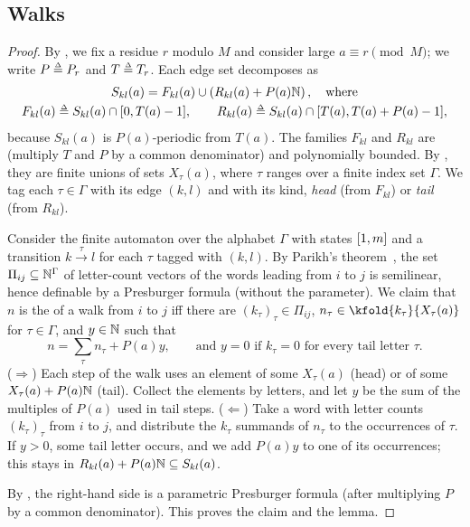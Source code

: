 \subsection{Walks}
\lemmaClosure*
\begin{proof}
    By , we fix a residue $r$ modulo $M$ and consider large $a \equiv r \pmod M$; we write $P \defeq P_r$ and $T \defeq T_r$.
    Each edge set decomposes as
    \begin{gather*}
        S_{kl}(a) = F_{kl}(a) \cup \left(R_{kl}(a) + P(a)\nat\right), \quad \text{where}\\
        F_{kl}(a) \defeq S_{kl}(a) \cap \range{0, T(a) - 1}, \qquad R_{kl}(a) \defeq S_{kl}(a) \cap \range{T(a), T(a) + P(a) - 1},
    \end{gather*}
    because $S_{kl}(a)$ is $P(a)$-periodic from $T(a)$.
    The families $F_{kl}$ and $R_{kl}$ are  (multiply $T$ and $P$ by a common denominator) and polynomially bounded.
    By , they are finite unions of sets $X_\tau(a)$, where $\tau$ ranges over a finite index set $\Gamma$.
    We tag each $\tau \in \Gamma$ with its edge $(k, l)$ and with its kind, \emph{head} (from $F_{kl}$) or \emph{tail} (from $R_{kl}$).

    Consider the finite automaton over the alphabet $\Gamma$ with states $[1, m]$ and a transition $k \xrightarrow{\tau} l$ for each $\tau$ tagged with $(k, l)$.
    By Parikh's theorem~\cite{parikhContextFreeLanguages1966}, the set $\Pi_{ij} \subseteq \mathbb{N}^{\Gamma}$ of letter-count vectors of the words leading from $i$ to $j$ is semilinear, hence definable by a Presburger formula (without the parameter).
    We claim that $n$ is the  of a walk from $i$ to $j$ iff
    there are $(k_\tau)_{\tau} \in \Pi_{ij}$, $n_\tau \in \kfold{k_\tau}{X_\tau(a)}$ for $\tau \in \Gamma$, and $y \in \mathbb{N}$ such that
    \[n = \textstyle\sum_{\tau} n_\tau + P(a) y, \qquad \text{and } y = 0 \text{ if } k_\tau = 0 \text{ for every tail letter } \tau.\]
    ($\Rightarrow$) Each step of the walk uses an element of some $X_\tau(a)$ (head) or of some $X_\tau(a) + P(a) \mathbb{N}$ (tail).
    Collect the elements by letters, and let $y$ be the sum of the multiples of $P(a)$ used in tail steps.
    ($\Leftarrow$) Take a word with letter counts $(k_\tau)_\tau$ from $i$ to $j$, and distribute the $k_\tau$ summands of $n_\tau$ to the occurrences of $\tau$.
    If $y > 0$, some tail letter occurs, and we add $P(a) y$ to one of its occurrences; this stays in $R_{kl}(a) + P(a) \mathbb{N} \subseteq S_{kl}(a)$.

    By , the right-hand side is a parametric Presburger formula (after multiplying $P$ by a common denominator).
    This proves the claim and the lemma.
\end{proof}
